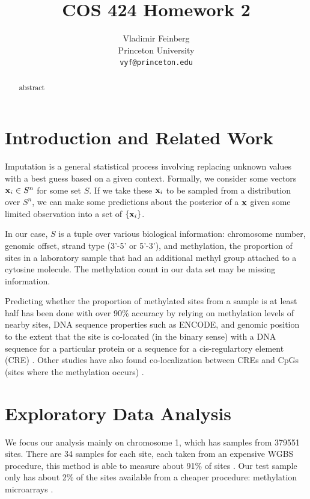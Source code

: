 \documentclass{article} %
\title{COS 424 Homework 2}
\author{
Vladimir Feinberg\\
Princeton University\\
\texttt{vyf@princeton.edu}
}
\begin{document}
\maketitle

\begin{abstract}
abstract
\end{abstract}

\section{Introduction and Related Work}

Imputation is a general statistical process involving replacing unknown values with a best guess based on a given context. Formally, we consider some vectors $\textbf{x}_i\in S^n$ for some set $S$. If we take these $\textbf{x}_i$ to be sampled from a distribution over $S^n$, we can make some predictions about the posterior of a $\textbf{x}$ given some limited observation into a set of $\{\textbf{x}_i\}$.

In our case, $S$ is a tuple over various biological information: chromosome number, genomic offset, strand type (3'-5' or 5'-3'), and methylation, the proportion of sites in a laboratory sample that had an additional methyl group attached to a cytosine molecule. The methylation count in our data set may be missing information.

Predicting whether the proportion of methylated sites from a sample is at least half has been done with over 90\% accuracy by relying on methylation levels of nearby sites, DNA sequence properties such as ENCODE, and genomic position to the extent that the site is co-located (in the binary sense) with a DNA sequence for a particular protein or a sequence for a cis-regulartory element (CRE) \cite{zhang2015predicting}. Other studies have also found co-localization between CREs and CpGs (sites where the methylation occurs) \cite{ziller2013charting}.

\section{Exploratory Data Analysis}

We focus our analysis mainly on chromosome 1, which has samples from 379551 sites. There are 34 samples for each site, each taken from an expensive WGBS procedure, this method is able to measure about 91\% of sites \cite{laird2010principles}. Our test sample only has about 2\% of the sites available from a cheaper procedure: methylation microarrays \cite{zhang2015predicting}.
\end{document}
